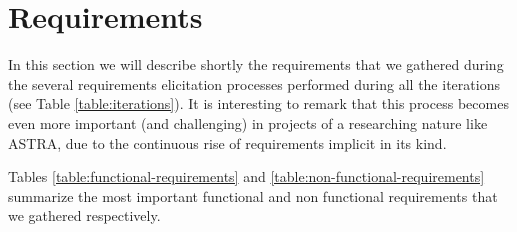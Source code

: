 \section{Requirements}
\label{sec:requirements}

In this section we will describe shortly the requirements that we gathered
during the several requirements elicitation processes performed during all the
iterations (see Table \ref{table:iterations}). 
It is interesting to remark that this process becomes even more important (and
challenging) in projects of a researching nature like ASTRA, due to the
continuous rise of requirements implicit in its kind.

Tables \ref{table:functional-requirements} and
\ref{table:non-functional-requirements} summarize the most important functional
and non functional requirements that we gathered respectively.
